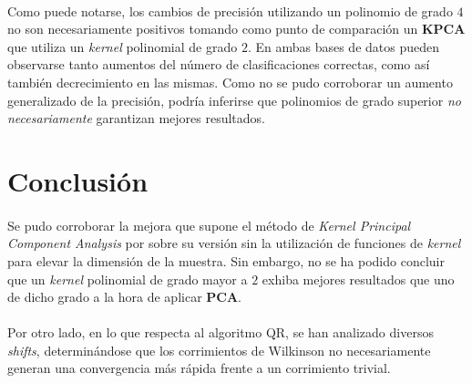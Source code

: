 \documentclass[12pt, twocolumn]{article}
\begin{document}
	\paragraph{} Como puede notarse, los cambios de precisión utilizando un polinomio de grado $4$ no son necesariamente positivos tomando como punto de comparación un \textbf{KPCA} que utiliza un \textit{kernel} polinomial de grado $2$. En ambas bases de datos pueden observarse tanto aumentos del número de clasificaciones correctas, como así también decrecimiento en las mismas. Como no se pudo corroborar un aumento generalizado de la precisión, podría inferirse que polinomios de grado superior \textit{no necesariamente} garantizan mejores resultados.
	
	\section{Conclusión}
	
	\paragraph{} Se pudo corroborar la mejora que supone el método de \textit{Kernel Principal Component Analysis} por sobre su versión sin la utilización de funciones de \textit{kernel} para elevar la dimensión de la muestra. Sin embargo, no se ha podido concluir que un \textit{kernel} polinomial de grado mayor a $2$ exhiba mejores resultados que uno de dicho grado a la hora de aplicar \textbf{PCA}.
	
	\paragraph{} Por otro lado, en lo que respecta al algoritmo QR, se han analizado diversos \textit{shifts}, determinándose que los corrimientos de Wilkinson no necesariamente generan una convergencia más rápida frente a un corrimiento trivial. 
	
\end{document}
